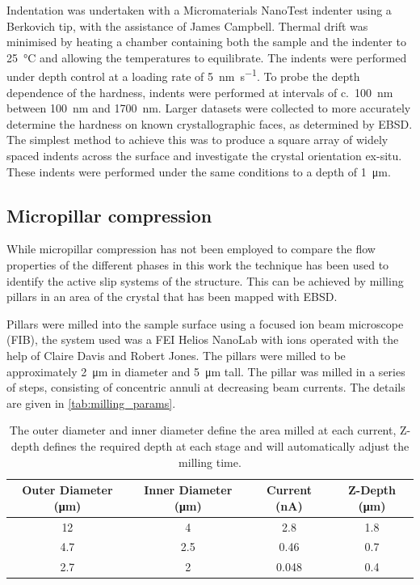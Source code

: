 Indentation was undertaken with a Micromaterials NanoTest indenter using a Berkovich tip, with the assistance of James Campbell. Thermal drift was minimised by heating a chamber containing both the sample and the indenter to \SI{25}{\celsius} and allowing the temperatures to equilibrate. The indents were performed under depth control at a loading rate of \SI{5}{\nano\meter\per\second}. To probe the depth dependence of the hardness, indents were performed at intervals of c.~\SI{100}{\nano\meter} between \SI{100}{\nano\meter} and \SI{1700}{\nano\meter}. Larger datasets were collected to more accurately determine the hardness on known crystallographic faces, as determined by EBSD. The simplest method to achieve this was to produce a square array of widely spaced indents across the surface and investigate the crystal orientation ex-situ. These indents were performed under the same conditions to a depth of \SI{1}{\micro\meter}.


\subsection{Micropillar compression}

While micropillar compression has not been employed to compare the flow properties of the different phases in this work the technique has been used to identify the active slip systems of the  structure. This can be achieved by milling pillars in an area of the crystal that has been mapped with EBSD. 

Pillars were milled into the sample surface using a focused ion beam microscope (FIB), the system used was a FEI Helios NanoLab with  ions operated with the help of Claire Davis and Robert Jones. The pillars were milled to be approximately \SI{2}{\micro\meter} in diameter and \SI{5}{\micro\meter} tall. The pillar was milled in a series of steps, consisting of concentric annuli at decreasing beam currents. The details are given in \autoref{tab:milling_params}.

\begin{table}[h!]
\centering
\begin{tabular}{ |c | c | c | c|}
\hline
Outer Diameter (\si{\micro\meter}) & Inner Diameter (\si{\micro\meter}) & Current (\si{\nano\ampere}) & Z-Depth (\si{\micro\meter}) \\
\hline
  12 \rule{0pt}{2.5ex} & 4 & 2.8 & 1.8  \\
  4.7 & 2.5 & 0.46 & 0.7 \\
  2.7 & 2 & 0.048 & 0.4 \\
  \hline
\end{tabular}
\caption{The outer diameter and inner diameter define the area milled at each current, Z-depth defines the required depth at each stage and will automatically adjust the milling time.\label{tab:milling_params}}
\end{table}


